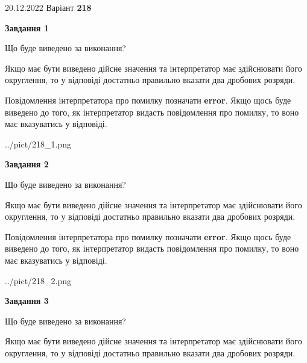 \documentclass[12pt, ukrainian]{article}
\begin{document}
{20.12.2022 Варіант \No \textbf { 218 }\par}
{
\begin {Large}

{\begin {center}\textbf{Завдання 1}\end {center}}\par
Що буде виведено за виконання? \par

Якщо має бути виведено дійсне значення та інтерпретатор має здійснювати його округлення, 
то у відповіді достатньо правильно вказати два дробових розряди.

Повідомлення інтерпретатора про помилку позначати \textbf{error}.
Якщо щось буде виведено до того, як інтерпретатор видасть повідомлення про помилку, 
то воно має вказуватись у відповіді. \par

\begin{center}
	{../pict/218_1.png}
\end{center}
\newpage

{\begin {center}\textbf{Завдання 2}\end {center}}\par
Що буде виведено за виконання? \par

Якщо має бути виведено дійсне значення та інтерпретатор має здійснювати його округлення, 
то у відповіді достатньо правильно вказати два дробових розряди.

Повідомлення інтерпретатора про помилку позначати \textbf{error}.
Якщо щось буде виведено до того, як інтерпретатор видасть повідомлення про помилку, 
то воно має вказуватись у відповіді. \par

\begin{center}
	{../pict/218_2.png}
\end{center}
\newpage

{\begin {center}\textbf{Завдання 3}\end {center}}\par
Що буде виведено за виконання? \par

Якщо має бути виведено дійсне значення та інтерпретатор має здійснювати його округлення, 
то у відповіді достатньо правильно вказати два дробових розряди.


\end{Large}}
\end{document}
